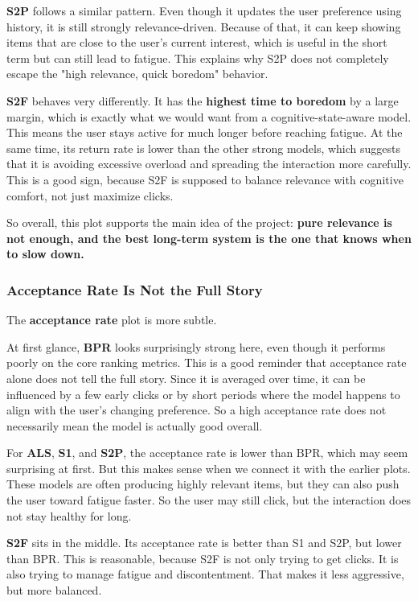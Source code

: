 \textbf{S2P} follows a similar pattern. 
Even though it updates the user preference using history, it is still strongly relevance-driven. 
Because of that, it can keep showing items that are close to the user's current interest, which is useful in the short term but can still lead to fatigue. 
This explains why S2P does not completely escape the "high relevance, quick boredom" behavior.

\textbf{S2F} behaves very differently. 
It has the \textbf{highest time to boredom} by a large margin, which is exactly what we would want from a cognitive-state-aware model. 
This means the user stays active for much longer before reaching fatigue. 
At the same time, its return rate is lower than the other strong models, which suggests that it is avoiding excessive overload and spreading the interaction more carefully. 
This is a good sign, because S2F is supposed to balance relevance with cognitive comfort, not just maximize clicks.

So overall, this plot supports the main idea of the project:
\textbf{pure relevance is not enough, and the best long-term system is the one that knows when to slow down.}

\subsubsection{Acceptance Rate Is Not the Full Story}

The \textbf{acceptance rate} plot is more subtle.

At first glance, \textbf{BPR} looks surprisingly strong here, even though it performs poorly on the core ranking metrics. 
This is a good reminder that acceptance rate alone does not tell the full story. 
Since it is averaged over time, it can be influenced by a few early clicks or by short periods where the model happens to align with the user's changing preference. 
So a high acceptance rate does not necessarily mean the model is actually good overall.

For \textbf{ALS}, \textbf{S1}, and \textbf{S2P}, the acceptance rate is lower than BPR, which may seem surprising at first. 
But this makes sense when we connect it with the earlier plots. 
These models are often producing highly relevant items, but they can also push the user toward fatigue faster. 
So the user may still click, but the interaction does not stay healthy for long.

\textbf{S2F} sits in the middle. 
Its acceptance rate is better than S1 and S2P, but lower than BPR. 
This is reasonable, because S2F is not only trying to get clicks. 
It is also trying to manage fatigue and discontentment. 
That makes it less aggressive, but more balanced.

